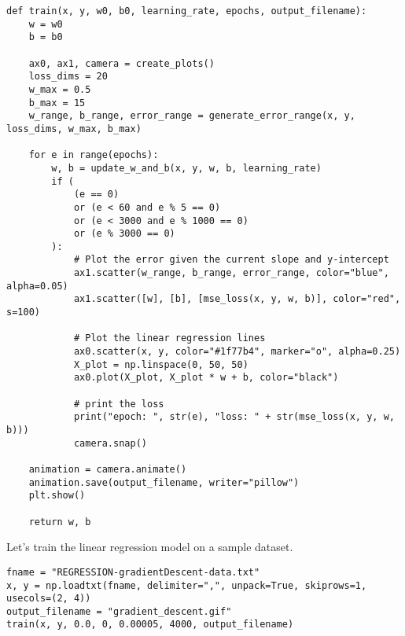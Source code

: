 \documentclass[openany]{book}
\begin{document}
\begin{tcolorbox}
\tiny
\begin{verbatim}
def train(x, y, w0, b0, learning_rate, epochs, output_filename):
    w = w0
    b = b0

    ax0, ax1, camera = create_plots()
    loss_dims = 20
    w_max = 0.5
    b_max = 15
    w_range, b_range, error_range = generate_error_range(x, y, loss_dims, w_max, b_max)

    for e in range(epochs):
        w, b = update_w_and_b(x, y, w, b, learning_rate)
        if (
            (e == 0)
            or (e < 60 and e % 5 == 0)
            or (e < 3000 and e % 1000 == 0)
            or (e % 3000 == 0)
        ):
            # Plot the error given the current slope and y-intercept
            ax1.scatter(w_range, b_range, error_range, color="blue", alpha=0.05)
            ax1.scatter([w], [b], [mse_loss(x, y, w, b)], color="red", s=100)

            # Plot the linear regression lines
            ax0.scatter(x, y, color="#1f77b4", marker="o", alpha=0.25)
            X_plot = np.linspace(0, 50, 50)
            ax0.plot(X_plot, X_plot * w + b, color="black")

            # print the loss
            print("epoch: ", str(e), "loss: " + str(mse_loss(x, y, w, b)))
            camera.snap()

    animation = camera.animate()
    animation.save(output_filename, writer="pillow")
    plt.show()

    return w, b
\end{verbatim}
\end{tcolorbox}
    Let's train the linear regression model on a sample dataset.

\begin{tcolorbox}
\tiny
\begin{verbatim}
fname = "REGRESSION-gradientDescent-data.txt"
x, y = np.loadtxt(fname, delimiter=",", unpack=True, skiprows=1, usecols=(2, 4))
output_filename = "gradient_descent.gif"
train(x, y, 0.0, 0, 0.00005, 4000, output_filename)
\end{verbatim}
\end{tcolorbox}

    \begin{center}
    \end{center}
    { \hspace*{\fill} \\}
        
\end{document}
